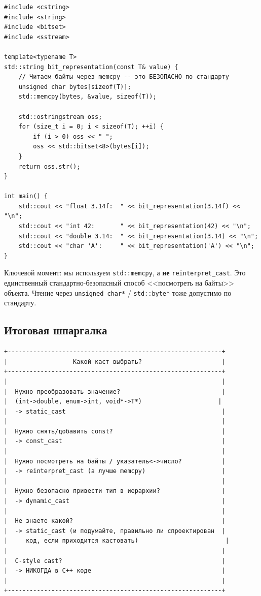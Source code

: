 \documentclass[a4paper,12pt]{article}
\begin{document}
\begin{lstlisting}
#include <cstring>
#include <string>
#include <bitset>
#include <sstream>

template<typename T>
std::string bit_representation(const T& value) {
    // Читаем байты через memcpy -- это БЕЗОПАСНО по стандарту
    unsigned char bytes[sizeof(T)];
    std::memcpy(bytes, &value, sizeof(T));

    std::ostringstream oss;
    for (size_t i = 0; i < sizeof(T); ++i) {
        if (i > 0) oss << " ";
        oss << std::bitset<8>(bytes[i]);
    }
    return oss.str();
}

int main() {
    std::cout << "float 3.14f:  " << bit_representation(3.14f) << "\n";
    std::cout << "int 42:       " << bit_representation(42) << "\n";
    std::cout << "double 3.14:  " << bit_representation(3.14) << "\n";
    std::cout << "char 'A':     " << bit_representation('A') << "\n";
}
\end{lstlisting}

Ключевой момент: мы используем \texttt{std::memcpy}, а \textbf{не}
\texttt{reinterpret\_cast}. Это единственный стандартно-безопасный способ
<<посмотреть на байты>> объекта. Чтение через \texttt{unsigned char*} /
\texttt{std::byte*} тоже допустимо по стандарту.

\subsection{Итоговая шпаргалка}

\begin{lstlisting}[numbers=none,basicstyle=\ttfamily\footnotesize]
+-----------------------------------------------------------+
|                  Какой каст выбрать?                      |
+-----------------------------------------------------------+
|                                                           |
|  Нужно преобразовать значение?                            |
|  (int->double, enum->int, void*->T*)                     |
|  -> static_cast                                           |
|                                                           |
|  Нужно снять/добавить const?                              |
|  -> const_cast                                            |
|                                                           |
|  Нужно посмотреть на байты / указатель<->число?           |
|  -> reinterpret_cast (а лучше memcpy)                     |
|                                                           |
|  Нужно безопасно привести тип в иерархии?                 |
|  -> dynamic_cast                                          |
|                                                           |
|  Не знаете какой?                                         |
|  -> static_cast (и подумайте, правильно ли спроектирован  |
|     код, если приходится кастовать)                        |
|                                                           |
|  C-style cast?                                            |
|  -> НИКОГДА в C++ коде                                    |
|                                                           |
+-----------------------------------------------------------+
\end{lstlisting}
\end{document}

